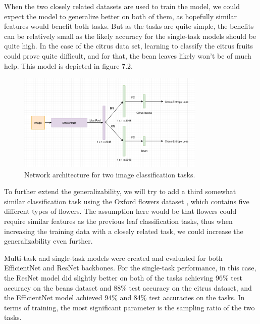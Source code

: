 When the two closely related datasets are used to train the model, we could expect the model to generalize better on both of them, as hopefully similar features would benefit both tasks.
But as the tasks are quite simple, the benefits can be relatively small as the likely accuracy for the single-task models should be quite high.
In the case of the citrus data set, learning to classify the citrus fruits could prove quite difficult, and for that, the bean leaves likely won't be of much help.
This model is depicted in figure 7.2.

\begin{figure}[h!]
    \centering
    \includegraphics[width=0.8\textwidth]{imgs/object_classification_architecture.png}
    \caption{Network architecture for two image classification tasks.}
\end{figure}

To further extend the generalizability, we will try to add a third somewhat similar classification task using the Oxford flowers dataset \citep{flowers102}, which contains five different types of flowers.
The assumption here would be that flowers could require similar features as the previous leaf classification tasks, thus when increasing the training data with a closely related task, we could increase the generalizability even further.

Multi-task and single-task models were created and evaluated for both EfficientNet and ResNet backbones.
For the single-task performance, in this case, the ResNet model did slightly better on both of the tasks achieving 96\% test accuracy on the beans dataset and 88\% test accuracy on the citrus dataset, and the EfficientNet model achieved 94\% and 84\% test accuracies on the tasks.
In terms of training, the most significant parameter is the sampling ratio of the two tasks.

